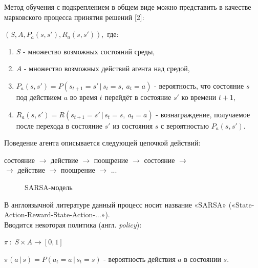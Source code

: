 \documentclass[a4paper]{report}
\theoremstyle{definition}
\theoremstyle{plain}
\theoremstyle{remark}
\theoremstyle{remark}
\theoremstyle{definition}
\begin{document}
Метод обучения с подкреплением в общем виде можно представить в качестве марковского процесса принятия решений [2]:
\begin{center}
	 $ (S, A, P_a(s, s'), R_a(s, s')),$ где:
\end{center}
\begin{enumerate}
 	\item $S$ - множество возможных состояний среды,
 	\item $A$ - множество возможных действий агента над средой,
 	\item $P_a(s, s') = P(s_{t+1}=s'\,|\,s_t=s,\:a_t=a)$ - вероятность, что состояние $s$ под действием $a$ во время $t$ перейдёт в состояние $s'$ ко времени $t+1$,
 	\item $R_a(s, s') = R(s_{t+1}=s'\,|\,s_t=s,\:a_t=a)$ - вознаграждение, получаемое после перехода в состояние $s'$ из состояния $s$ с вероятностью $P_a(s,s')$.
\end{enumerate}


Поведение агента описывается следующей цепочкой действий:
\begin{center}
состояние $\rightarrow$ действие
$\rightarrow$ поощрение $\rightarrow$ состояние $\rightarrow$ \\
$\rightarrow$ действие $\rightarrow$ поощрение $\rightarrow$ ... 
\end{center}

\begin{figure}[h]
	\caption{SARSA-модель}
\end{figure}

В англоязычной литературе данный процесс носит название «SARSA» («State-Action-Reward-State-Action-...»).\\

Вводится некоторая политика (англ. \textit{policy}):
\begin{center}
	$\pi \, : \; S \times A \rightarrow [0, 1]$

$\pi(a\,|\,s) = P(a_t=a\,|\,s_t=s)$ - вероятность действия $a$ в состоянии $s$.
\end{center}
\end{document}
